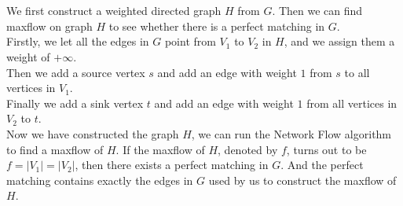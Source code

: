 \documentclass[12pt,letterpaper]{article}
\begin{document}
\section{}


\newpage
\section{}
\subsection{}
We first construct a weighted directed graph $H$ from $G$.
Then we can find maxflow on graph $H$ to see whether there is a perfect matching in $G$.\\
Firstly, we let all the edges in $G$ point from $V_1$ to $V_2$ in $H$,
and we assign them a weight of $+\infty$.\\
Then we add a source vertex $s$ and 
add an edge with weight $1$ from $s$ to all vertices in $V_1$.\\
Finally we add a sink vertex $t$ and 
add an edge with weight $1$ from all vertices in $V_2$ to $t$.\\
Now we have constructed the graph $H$,
we can run the Network Flow algorithm to find a maxflow of $H$.
If the maxflow of $H$, denoted by $f$,
turns out to be $f=|V_1|=|V_2|$,
then there exists a perfect matching in $G$.
And the perfect matching contains exactly the edges in $G$ used 
by us to construct the maxflow of $H$.
\end{document}
